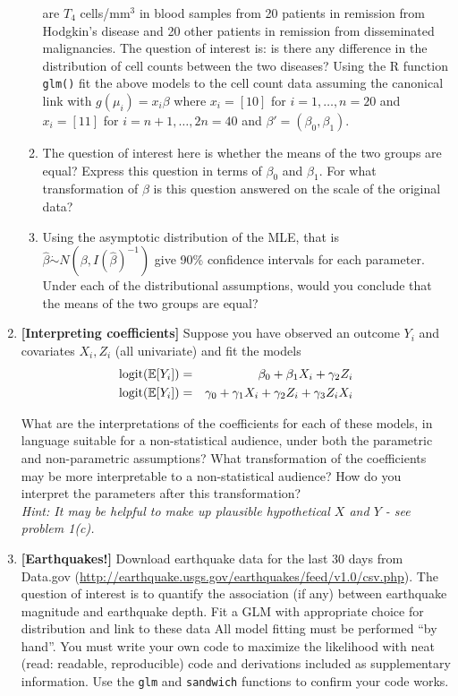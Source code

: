 \documentclass[12pt]{article}
\newcommand{\e}{\mathbb{E}}
\begin{document}
\begin{enumerate}
\begin{enumerate}
are $T_4$ cells/mm$^3$ in blood samples from 20 patients in remission from Hodgkin's disease and 20 other patients in remission from disseminated malignancies. The question of interest is: is there any difference in the distribution of cell counts between the two diseases? Using the R function {\tt glm()} fit the above models to the cell count data assuming the canonical link with $g(\mu_i)  = x_i \beta$ where $x_i = [1 0]$ for $i = 1,\ldots, n=20$ and $x_i = [1 1]$ for $i = n+1,\ldots,2n=40$ and $\beta' = (\beta_0,\beta_1)$. 
\item The question of interest here is whether the means of the two groups are equal? Express this question in terms of $\beta_0$ and $\beta_1$. For what transformation of $\beta$ is this question answered on the scale of the original data? 
\item Using the asymptotic distribution of the MLE, that is $\hat{\beta} \dot{\sim} N(\beta,I(\hat{\beta})^{-1})$ give 90\% confidence intervals for each parameter. Under each of the distributional assumptions, would you conclude that the means of the two groups are equal? 
\end{enumerate} 

\item \textbf{[Interpreting coefficients]}
Suppose you have observed an outcome $Y_i$ and covariates $X_i, Z_i$ (all univariate) and fit the models
\begin{eqnarray}
{\rm logit}(\e[Y_i]) &=& \beta_0 + \beta_1 X_i + \gamma_2 Z_i\\
{\rm logit}(\e[Y_i]) &=& \gamma_0 + \gamma_1 X_i + \gamma_2 Z_i  + \gamma_3 Z_iX_i
\end{eqnarray}

What are the interpretations of the coefficients for each of these models, in language suitable for a non-statistical audience, under both the parametric and non-parametric assumptions? What transformation of the coefficients may be more interpretable to a non-statistical audience? How do you interpret the parameters after this transformation?\\
{\it Hint: It may be helpful to make up plausible hypothetical $X$ and $Y$ - see problem 1(c).}


\item \textbf{[Earthquakes!]}
Download earthquake data for the last 30 days from Data.gov (\url{http://earthquake.usgs.gov/earthquakes/feed/v1.0/csv.php}). The question of interest is to quantify the association (if any) between earthquake magnitude and earthquake depth. Fit a GLM with appropriate  choice for distribution and link to these data  All model fitting must be performed ``by hand''. You must write your own code to maximize the likelihood with neat (read: readable, reproducible) code and derivations included as supplementary information. Use the {\tt glm} and {\tt sandwich} functions to confirm your code works. 
\end{enumerate}
\end{document}
